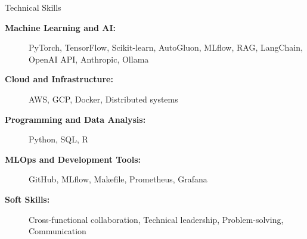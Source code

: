 \documentclass{resume}
\begin{document}
\begin{rSection}{Technical Skills}
    \begin{description}
                    \item[\textbf{Machine Learning and AI:}] \raggedright PyTorch, TensorFlow, Scikit-learn, AutoGluon, MLflow, RAG, LangChain, OpenAI API, Anthropic, Ollama\\[0.3ex]
                    \item[\textbf{Cloud and Infrastructure:}] \raggedright AWS, GCP, Docker, Distributed systems\\[0.3ex]
                    \item[\textbf{Programming and Data Analysis:}] \raggedright Python, SQL, R\\[0.3ex]
                    \item[\textbf{MLOps and Development Tools:}] \raggedright GitHub, MLflow, Makefile, Prometheus, Grafana\\[0.3ex]
                    \item[\textbf{Soft Skills:}] \raggedright Cross-functional collaboration, Technical leadership, Problem-solving, Communication\\[0.3ex]
            \end{description}
\end{rSection}
\end{document}
